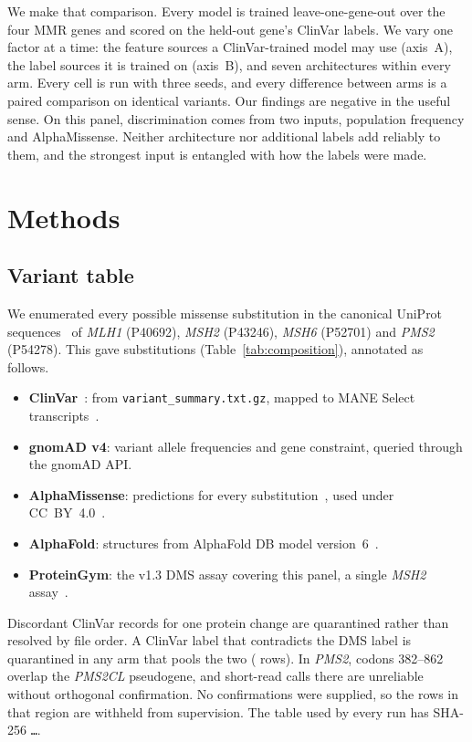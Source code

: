 \documentclass[11pt]{article}
\newcommand{\gene}[1]{\textit{#1}}
\begin{document}
We make that comparison. Every model is trained leave-one-gene-out over the four MMR
genes and scored on the held-out gene's ClinVar labels. We vary one factor at a time:
the feature sources a ClinVar-trained model may use (axis~A), the label sources it is
trained on (axis~B), and seven architectures within every arm. Every cell is run with
three seeds, and every difference between arms is a paired comparison on identical
variants. Our findings are negative in the useful sense. On this panel, discrimination
comes from two inputs, population frequency and AlphaMissense. Neither architecture nor
additional labels add reliably to them, and the strongest input is entangled with how
the labels were made.

\section{Methods}

\subsection{Variant table}

We enumerated every possible missense substitution in the canonical UniProt
sequences~\citep{uniprot2025} of \gene{MLH1} (P40692), \gene{MSH2} (P43246), \gene{MSH6}
(P52701) and \gene{PMS2} (P54278). This gave \nRows{} substitutions (Table~\ref{tab:composition}),
annotated as follows.
\begin{itemize}
\item \textbf{ClinVar}~\citep{landrum2018clinvar}: from \texttt{variant\_summary.txt.gz},
  mapped to MANE Select transcripts~\citep{morales2022mane}.
\item \textbf{gnomAD v4}: variant allele frequencies and gene constraint, queried through
  the gnomAD API.
\item \textbf{AlphaMissense}: predictions for every substitution~\citep{cheng2023alphamissense},
  used under CC~BY~4.0~\citep{alphamissense2024licence}.
\item \textbf{AlphaFold}: structures from AlphaFold DB model version~6~\citep{varadi2022afdb}.
\item \textbf{ProteinGym}: the v1.3 DMS assay covering this panel, a single \gene{MSH2}
  assay~\citep{jia2021msh2,notin2023proteingym}.
\end{itemize}
Discordant ClinVar records for one protein change are quarantined rather than resolved
by file order. A ClinVar label that contradicts the DMS label is quarantined in any arm
that pools the two (\nConflictQuarantined{} rows). In \gene{PMS2}, codons 382--862 overlap
the \gene{PMS2CL} pseudogene, and short-read calls there are unreliable without
orthogonal confirmation. No confirmations were supplied, so the \pmsHomologyRows{} rows
in that region are withheld from supervision. The table used by every run has SHA-256
\texttt{\datasetSha\ldots}.
\end{document}
